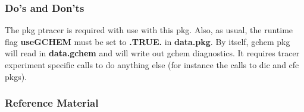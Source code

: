\subsubsection{Do's and Don'ts}

The pkg ptracer is required with use with this pkg. Also, as usual, the
runtime flag \textbf{useGCHEM} must be set to \textbf{.TRUE.} in \textbf{data.pkg}.
By itself, gchem pkg will read in \textbf{data.gchem} and will
write out gchem diagnostics. It requires tracer experiment
specific calls to do anything else (for instance the calls
to dic and cfc pkgs).

\subsubsection{Reference Material}

